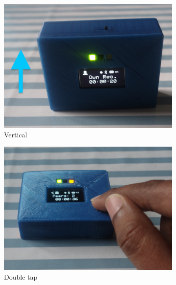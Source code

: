 \documentclass[mscthesis]{usiinfthesis}
\begin{document}
\begin{figure} [!ht]
\begin{subfigure}{0.20\textwidth}
\includegraphics[width=\linewidth]{Vertical}
\caption{Vertical} \label{fig:1c}
\end{subfigure}
\hspace*{\fill} %
\begin{subfigure}{0.20\textwidth}
\includegraphics[width=\linewidth]{Doubletap}
\caption{Double tap} \label{fig:1d}
\end{subfigure}
\hspace*{\fill} %
\begin{subfigure}{0.16\textwidth}

\end{subfigure}
\end{figure}
\end{document}
